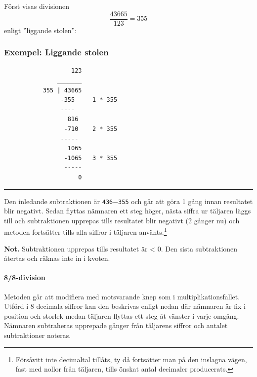 \documentclass[oneside,10pt,a4paper,swedish]{scrbook}
\newcommand{\startex}[1]{\subsubsection{Exempel: #1}}
\newcommand{\slutex}{\vspace{-8mm}\begin{flushright} \rule{1ex}{1ex} \end{flushright}}
\newcommand{\asm}[1]{\texttt{#1}}
\begin{document}
Först visas divisionen \[\frac{43665}{123} = 355\] enligt  ''liggande stolen'':


\startex{Liggande stolen}
\begin{center}
\begin{lstlisting}
                   123
               _______
           355 | 43665
                -355     1 * 355
                ----
                  816
                 -710    2 * 355     
                -----
                  1065   
                 -1065   3 * 355
                 -----
                     0  
\end{lstlisting}
\end{center}
\slutex

Den inledande subtraktionen är \asm{436}$-$\asm{355} och  går att göra 1 gång innan resultatet blir negativt. Sedan flyttas nämnaren ett steg höger, nästa siffra ur täljaren läggs till och subtraktionen upprepas tills resultatet blir negativt (2 gånger nu) och metoden fortsätter tills alla siffror i täljaren använts.\footnote{Försåvitt inte decimaltal tillåts, ty då fortsätter man på den inslagna vägen, fast  med nollor från täljaren, tills önskat antal decimaler producerats.}

\textbf{Not.} Subtraktionen upprepas tills resultatet är < 0. Den sista subtraktionen återtas och räknas inte in i kvoten.

\newpage

\paragraph{8/8-division}

Metoden går att modifiera med motsvarande knep som i multiplikationsfallet. Utförd i 8 decimala siffror kan den beskrivas enligt nedan där nämnaren är fix i position och storlek medan täljaren flyttas ett steg åt vänster i varje omgång. Nämnaren subtraheras upprepade gånger från täljarens siffror och antalet subtraktioner noteras.
\end{document}
